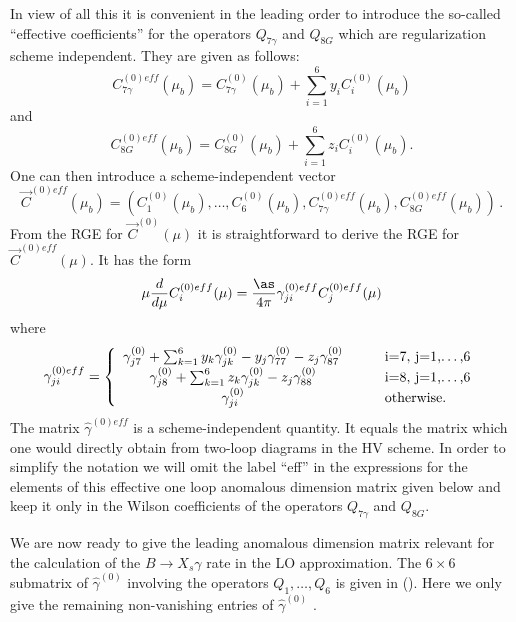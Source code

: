 In view of all this  it is convenient in the leading order to introduce
the so-called ``effective coefficients'' \cite{BMMP:94} for the
operators $Q_{7\gamma}$ and $Q_{8G}$ which are regularization scheme
independent. They are given as follows:
\begin{equation} \label{eq:defc7eff}
C^{(0)eff}_{7\gamma}(\mu_b) =
C^{(0)}_{7\gamma}(\mu_b) + \sum_{i=1}^6 y_i C^{(0)}_i(\mu_b)
\end{equation}
and 
\begin{equation}\label{eq:defc8eff}
C^{(0)eff}_{8G}(\mu_b) = C^{(0)}_{8G}(\mu_b) 
+ \sum_{i=1}^6 z_i C^{(0)}_i(\mu_b).
\end{equation}
One can then introduce a scheme-independent vector
\begin{equation} 
\vec{C}^{(0)eff}(\mu_b) = \left( C^{(0)}_1(\mu_b),\ldots, C^{(0)}_6(\mu_b), 
C^{(0)eff}_{7\gamma}(\mu_b),C^{(0)eff}_{8G}(\mu_b) \right) \, .
\end{equation}
From the RGE for $\vec{C}^{(0)}(\mu)$ it is straightforward
to derive the RGE for $\vec{C}^{(0)eff}(\mu)$. It has the form
\begin{equation} \label{RGEeff}
\mu \frac{d}{d \mu} C^{(0)eff}_i(\mu) = 
\frac{\as}{4\pi} \gamma^{(0)eff}_{ji} C^{(0)eff}_j(\mu)
\end{equation}
where
\begin{equation} \label{def.geff}
\gamma^{(0)eff}_{ji} = \left\{ \begin{array}{ccl}
\gamma^{(0)}_{j7} +
\sum_{k=1}^6 y_k\gamma^{(0)}_{jk} -y_j\gamma^{(0)}_{77} -z_j\gamma^{(0)}_{87}
&\quad& $i=7$,\ $j=1,\ldots,6$ \\
\gamma^{(0)}_{j8} +
\sum_{k=1}^6 z_k\gamma^{(0)}_{jk} -z_j\gamma^{(0)}_{88}
&\quad& $i=8$,\ $j=1,\ldots,6$ \\
\gamma^{(0)}_{ji} &\quad& \mbox{otherwise.}
\end{array}
\right.
\end{equation}
The matrix $\hat\gamma^{(0)eff}$ is a scheme-independent quantity.
It equals the matrix which one would directly obtain from two-loop
diagrams in the HV scheme.  In order to simplify the notation we will
omit the label ``eff'' in the expressions for the elements of this
effective one loop anomalous dimension matrix given below and keep it
only in the Wilson coefficients of the operators $Q_{7\gamma}$ and
$Q_{8G}$.

We are now ready to give the leading anomalous dimension matrix 
relevant for the calculation of the $B\to X_s\gamma $ rate in the
LO approximation.
The
$6 \times 6$ submatrix of $\hat\gamma^{(0)}$ involving the operators
$Q_1,\ldots,Q_6$ is given in (). Here we only give the
remaining non-vanishing entries of $\hat\gamma^{(0)}$
\cite{CFMRS:93,CFRS:94}.

